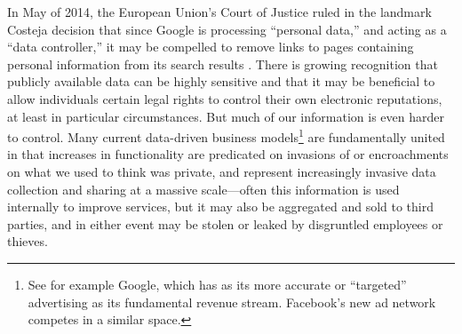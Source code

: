 
 In May of 2014, the European
Union's Court of Justice 
ruled in the landmark Costeja decision that since Google is processing
``personal data,'' and acting as a ``data controller,'' it may be
compelled to remove links to pages containing personal information
from its search results \cite{ICO} \cite{COJCosteja}. There is growing recognition that publicly
available data can be highly sensitive and that it may be beneficial
to allow individuals certain legal rights to control their own
electronic reputations, at least in particular circumstances. But much of our
information is even harder to control. Many current data-driven
business models\footnote{See for example 
  Google, which has as its more accurate or ``targeted'' advertising
  as its fundamental revenue stream. Facebook's new ad network
  competes in a similar space.} are fundamentally united in that increases in
functionality are predicated on invasions of or encroachments on what
we used to think was private, and represent increasingly invasive data
collection and sharing at a massive scale---often this information is
used internally to improve services, but it may also be aggregated and
sold to third parties, and in either event may be stolen or leaked by
disgruntled employees or thieves. %

